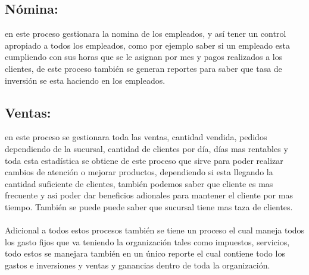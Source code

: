 \subsection{N\'omina:}en este proceso gestionara la nomina de los empleados, y as\'i tener un control apropiado a todos los empleados, como por ejemplo saber si un empleado esta cumpliendo con sus horas que se le asignan por mes y pagos realizados a los clientes, de este proceso tambi\'en se generan reportes para saber que tasa de inversi\'on se esta haciendo en los empleados.%
\subsection{Ventas:}en este proceso se gestionara toda las ventas, cantidad vendida, pedidos dependiendo de la sucursal, cantidad de clientes por d\'ia, d\'ias mas rentables y toda esta estad\'istica se obtiene de este proceso que sirve para poder realizar cambios de atenci\'on o mejorar productos, dependiendo si esta llegando la cantidad suficiente de clientes, tambi\'en podemos saber que cliente es mas frecuente y asi poder dar beneficios adionales para mantener el cliente por mas tiempo. Tambi\'en se puede puede saber que sucursal tiene mas taza de clientes.%
\\%
\\%
Adicional a todos estos procesos tambi\'en se tiene un proceso el cual maneja todos los gasto fijos que va teniendo la organizaci\'on tales como impuestos, servicios, todo estos se manejara tambi\'en en un \'unico reporte el cual contiene todo los gastos e inversiones y  ventas y ganancias dentro de toda la organizaci\'on.%
\\%
\\%
